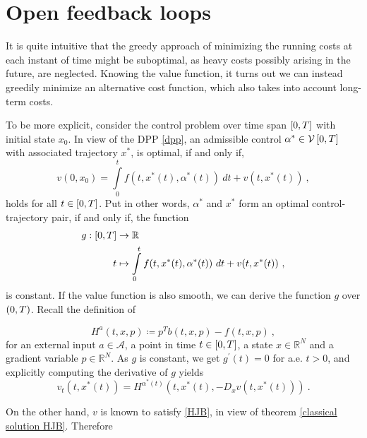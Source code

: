 \section{Open feedback loops}

It is quite intuitive that the greedy approach of minimizing the running costs at each instant of time might be suboptimal, as heavy costs possibly arising in the future, are neglected. Knowing the value function, it turns out we can instead greedily minimize an alternative  cost function, which also takes into account long-term costs.

To be more explicit, consider the control problem over time span $ \left[ 0, T \right] $ with initial state $ x_0 $. In view of the DPP \eqref{dpp}, an admissible control $ \alpha^* \in \mathcal{V}\left[ {0}, T \right] $ with associated trajectory $ x^* $, is optimal, if and only if,
\begin{equation*}
	v(0, x_0) = \int\limits_{0}^{t} f(t, x^{*}(t), \alpha^{*}(t)) \  dt + v(t, x^{*}(t)) \ ,
\end{equation*}
holds for all $ t \in \left[ 0, T \right] $. Put in other words, $ \alpha^* $ and $ x^* $ form an optimal control-trajectory pair, if and only if, the function
\begin{align*}
	g : \left[ 0, T \right] &\to \mathbb{R} \\
	t &\mapsto \int\limits_{0}^{t} f(t, x^{*}(t), \alpha^{*}(t)) \  dt + v(t, x^{*}(t)) \ ,
\end{align*}
is constant. If the value function is also smooth, we can derive the function $ g $ over $ \left(0, T\right) $. Recall the definition of

\begin{equation*}
	H^a(t, x, p) \coloneqq p^T b(t, x, p) - f(t, x, p) \ ,
\end{equation*}
for an external input $ a \in \mathcal{A} $, a point in time $ t \in \left[ 0, T \right] $, a state $ x \in \mathbb{R}^N $ and a gradient variable $ p \in \mathbb{R}^N $.
As $ g $ is constant, we get $ g^{\prime}(t) = 0 $ for a.e. $ t > 0 $, and explicitly computing the derivative of $ g $ yields
\begin{equation}
\label{control Hamiltonian}
	v_t(t, x^{*}(t)) = H^{\alpha^{*}(t)}(t, x^{*}(t), -D_x v(t, x^{*}(t))) \ .
\end{equation}

On the other hand, $ v $ is known to satisfy \eqref{HJB}, in view of theorem \ref{classical solution HJB}. Therefore

